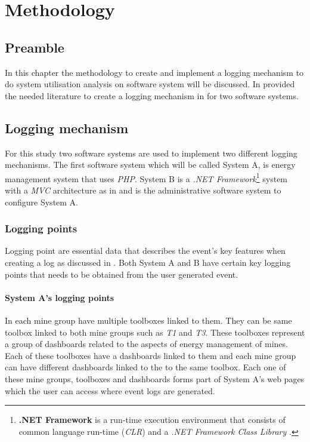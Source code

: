 \chapter{Methodology}
\label{chap:2}

\section{Preamble}
In this chapter the methodology to create and implement a logging mechanism to do system utilisation analysis on software system will be discussed. In  provided the needed literature to create a logging mechanism in  for two software systems.

\section{Logging mechanism}\label{sec:Ch3_LoggingMechanism}
For this study two software systems are used to implement two different logging mechanisms. The first software system which will be called System A, is energy management system that uses \emph{PHP}. System B is a \emph{.NET Framework}\footnote{\label{ftn:NetFramework}\textbf{.NET Framework} is a run-time execution environment that consists of common language run-time (\emph{CLR}) and a \emph{.NET Framework Class Library} \cite{Harkness2007}.} system with a \emph{MVC} architecture as in  and is the administrative software system to configure System A.

\subsection{Logging points}
Logging point are essential data that describes the event's key features when creating a log as discussed in . Both System A and B have certain key logging points that needs to be obtained from the user generated event.

\subsubsection{System A's logging points}
In  each mine group have multiple toolboxes linked to them. They can be same toolbox linked to both mine groups such as \emph{T1} and \emph{T3}. These toolboxes represent a group of dashboards related to the aspects of energy management of mines. Each of these toolboxes have a dashboards linked to them and each mine group can have different dashboards linked to the to the same toolbox. Each one of these mine groups, toolboxes and dashboards forms part of System A's web pages which the user can access where event logs are generated.

